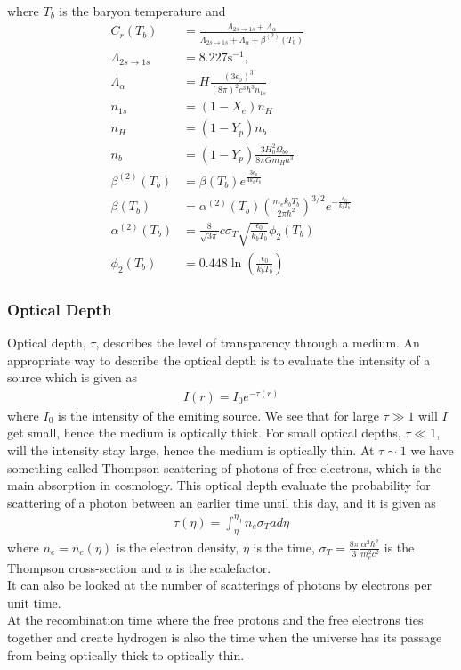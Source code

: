 \documentclass{aa}
\begin{document}
where $T_b$ is the baryon temperature and 
\begin{align*}
C_r(T_b) &= \frac{\Lambda_{2s\rightarrow1s} +
\Lambda_{\alpha}}{\Lambda_{2s\rightarrow1s} + \Lambda_{\alpha} +
\beta^{(2)}(T_b)}\\
\Lambda_{2s\rightarrow1s} &= 8.227 \textrm{s}^{-1},\\
\Lambda_{\alpha} &= H\frac{(3\epsilon_0)^3}{(8\pi)^2 c^3\hbar^3 n_{1s}}\\
n_{1s} &= (1-X_e)n_H\\
n_H &= (1-Y_p)n_b\\
n_b &= (1-Y_p)\frac{3H_0^2 \Omega_{b0}}{8\pi G m_H a^3}\\
\beta^{(2)}(T_b) &= \beta(T_b) e^{\frac{3\epsilon_0}{4k_bT_b}}\\
\beta(T_b) &= \alpha^{(2)}(T_b) \left(\frac{m_e k_b
T_b}{2\pi \hbar^2}\right)^{3/2} e^{-\frac{\epsilon_0}{k_bT_b}}\\
\alpha^{(2)}(T_b) &= \frac{8}{\sqrt{3\pi}}
c\sigma_T\sqrt{\frac{\epsilon_0}{k_bT_b}}\phi_2(T_b)\\
\phi_2(T_b) &= 0.448\ln\left(\frac{\epsilon_0}{k_bT_b}\right)
\end{align*}
\subsubsection{Optical Depth}
Optical depth, $\tau$, describes the level of transparency through a medium. An appropriate way to describe the optical depth is to evaluate the intensity of a source which is given as 
\begin{align*}
    I(r)=I_0e^{-\tau(r)}
\end{align*}
where $I_0$ is the intensity of the emiting source. We see that for large $\tau \gg1$ will $I$ get small, hence the medium is optically thick. For small optical depths, $\tau\ll1$, will the intensity stay large, hence the medium is optically thin. At $\tau\sim 1$ we have something called Thompson scattering of photons of free electrons, which is the main absorption in cosmology. This optical depth evaluate the probability for scattering of a photon between an earlier time until this day, and it is given as
\begin{align}
    \tau(\eta)=\int_\eta^{\eta_0}n_e\sigma_Tad\eta\label{eq:Thompson_optical}
\end{align}
where $n_e=n_e(\eta)$ is the electron density, $\eta$ is the time, $\sigma_T=\frac{8\pi}{3}\frac{\alpha^2\hbar^2}{m_e^2c^2}$ is the Thompson cross-section and $a$ is the scalefactor. \\
It can also be looked at the number of scatterings of photons by electrons per unit time.  \\
At the recombination time where the free protons and the free electrons ties together and create hydrogen is also the time when the universe has its passage from being optically thick to optically thin.
\end{document}
